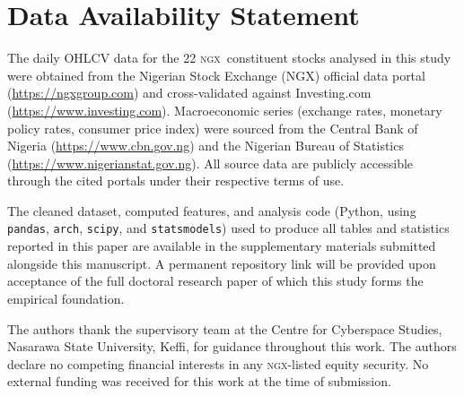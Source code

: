 \documentclass[twoside,11pt]{article}
\newcommand{\ngx}{\textsc{ngx}}
\begin{document}
	\section*{Data Availability Statement}
	\label{sec:data_availability}
	
	The daily OHLCV data for the 22 \ngx\ constituent stocks analysed in this study were obtained from the Nigerian Stock Exchange (NGX) official data portal (\url{https://ngxgroup.com}) and cross-validated
	against Investing.com (\url{https://www.investing.com}). Macroeconomic series (exchange rates, monetary policy rates, consumer price index) were sourced from the Central Bank of Nigeria	(\url{https://www.cbn.gov.ng}) and the Nigerian Bureau of Statistics (\url{https://www.nigerianstat.gov.ng}). All source data are publicly accessible through the cited portals under their respective terms of use.
	
	The cleaned dataset, computed features, and analysis code (Python, using \texttt{pandas}, \texttt{arch}, \texttt{scipy}, and	\texttt{statsmodels}) used to produce all tables and statistics reported in this paper are available in the supplementary materials submitted alongside this manuscript. A permanent repository link
	will be provided upon acceptance of the full doctoral research paper of which this study forms the empirical foundation.
	
	\begin{acks}
		The authors thank the supervisory team at the Centre for Cyberspace Studies, Nasarawa State University, Keffi, for guidance throughout this work. The authors declare no competing financial interests in any \ngx-listed equity security. No external funding was received for this work at the time of submission.
	\end{acks}
	
	\vskip 0.2in
	
	
\end{document}
